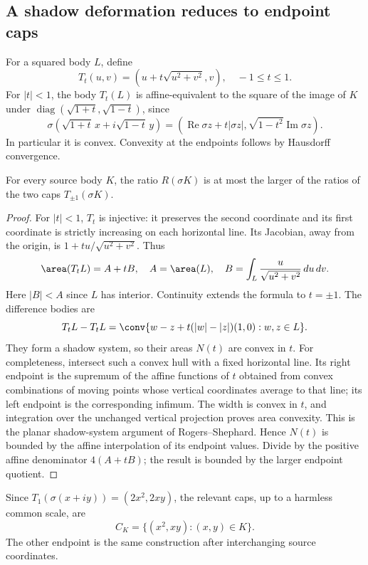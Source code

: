 \subsection{A shadow deformation reduces to endpoint caps}
For a squared body $L$, define
\[
 T_t(u,v)=(u+t\sqrt{u^2+v^2},v),\quad -1\leq t\leq1.
\]
For $|t|<1$, the body $T_t(L)$ is affine-equivalent to the square of the image of $K$ under $\operatorname{diag}(\sqrt{1+t},\sqrt{1-t})$, since
\[
 \sigma(\sqrt{1+t}\,x+i\sqrt{1-t}\,y)
 =(\operatorname{Re}\sigma z+t|\sigma z|,\sqrt{1-t^2}\operatorname{Im}\sigma z).
\]
In particular it is convex. Convexity at the endpoints follows by Hausdorff convergence.
\begin{lemma}
For every source body $K$, the ratio $R(\sigma K)$ is at most the larger of the ratios of the two caps $T_{\pm1}(\sigma K)$.
\end{lemma}
\begin{proof}
For $|t|<1$, $T_t$ is injective: it preserves the second coordinate and its first coordinate is strictly increasing on each horizontal line. Its Jacobian, away from the origin, is $1+tu/\sqrt{u^2+v^2}$. Thus
\[
 \area(T_tL)=A+tB,\quad A=\area(L),\quad B=\int_L\frac{u}{\sqrt{u^2+v^2}}\,du\,dv.
\]
Here $|B|<A$ since $L$ has interior. Continuity extends the formula to $t=\pm1$.
The difference bodies are
\[
 T_tL-T_tL=\conv\{w-z+t(|w|-|z|)(1,0):w,z\in L\}.
\]
They form a shadow system, so their areas $N(t)$ are convex in $t$. For completeness, intersect such a convex hull with a fixed horizontal line. Its right endpoint is the supremum of the affine functions of $t$ obtained from convex combinations of moving points whose vertical coordinates average to that line; its left endpoint is the corresponding infimum. The width is convex in $t$, and integration over the unchanged vertical projection proves area convexity. This is the planar shadow-system argument of Rogers--Shephard. Hence $N(t)$ is bounded by the affine interpolation of its endpoint values. Divide by the positive affine denominator $4(A+tB)$; the result is bounded by the larger endpoint quotient.
\end{proof}
Since $T_1(\sigma(x+iy))=(2x^2,2xy)$, the relevant caps, up to a harmless common scale, are
\[
 C_K=\{(x^2,xy):(x,y)\in K\}.
\]
The other endpoint is the same construction after interchanging source coordinates.

